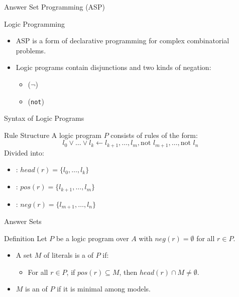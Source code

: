 \begin{frame}{Answer Set Programming (ASP)}
    \begin{block}{Logic Programming}
        \begin{itemize}
            \item ASP is a form of declarative programming for complex combinatorial problems.
            \item Logic programs contain disjunctions and two kinds of negation:
                  \begin{itemize}
                      \item {} ($\neg$)
                      \item {} (\texttt{not})
                  \end{itemize}
        \end{itemize}
    \end{block}
\end{frame}

\begin{frame}{Syntax of Logic Programs}
    \begin{block}{Rule Structure}
        A logic program $P$ consists of rules of the form:
        \[
            l_0 \lor \dots \lor l_k \leftarrow l_{k+1}, \dots, l_m, \text{not } l_{m+1}, \dots, \text{not } l_n
        \]
        Divided into:
        \begin{itemize}
            \item {}: $head(r) = \{l_0, \dots, l_k\}$
            \item {}: $pos(r) = \{l_{k+1}, \dots, l_m\}$
            \item {}: $neg(r) = \{l_{m+1}, \dots, l_n\}$
        \end{itemize}
    \end{block}
\end{frame}

\begin{frame}{Answer Sets}
    \begin{block}{Definition}
        Let $P$ be a logic program over $A$ with $neg(r) = \emptyset$ for all $r \in P$.
        \begin{itemize}
            \item A set $M$ of literals is a  of $P$ if:
                  \begin{itemize}
                      \item For all $r \in P$, if $pos(r) \subseteq M$, then $head(r) \cap M \neq \emptyset$.
                  \end{itemize}
            \item $M$ is an  of $P$ if it is minimal among models.
        \end{itemize}
    \end{block}
\end{frame}


